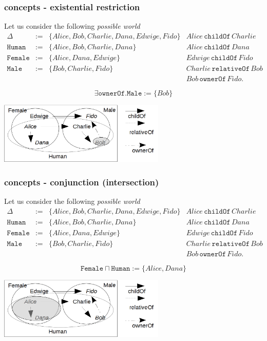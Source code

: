 \documentclass[8pt]{beamer}
\newcommand{\Human}{\mathtt{Human}}
\newcommand{\Male}{\mathtt{Male}}
\newcommand{\Female}{\mathtt{Female}}
\newcommand{\relative}{\mathtt{relativeOf}}
\newcommand{\child}{\mathtt{childOf}}
\newcommand{\owner}{\mathtt{ownerOf}}
\newcommand{\Alice}{Alice}
\newcommand{\Bob}{Bob}
\newcommand{\Charlie}{Charlie}
\newcommand{\Dana}{Dana}
\newcommand{\Edwige}{Edwige}
\newcommand{\Fido}{Fido}
\begin{document}
\begin{frame}
 \frametitle{\elplusplus concepts - existential restriction}
 Let us consider the following \emph{possible world}
 \[
 \begin{array}{rcl|l}
  \Delta & := & \{ \Alice, \Bob, \Charlie, \Dana, \Edwige, \Fido \} & \Alice\,\child\,\Charlie \\
  \Human & := & \{ \Alice, \Bob, \Charlie, \Dana \} & \Alice\,\child\,\Dana\\
  \Female & := & \{ \Alice, \Dana, \Edwige \} & \Edwige\,\child\,\Fido\\
  \Male & := & \{ \Bob, \Charlie, \Fido \} & \Charlie\,\relative\,\Bob \\
  & & & \Bob\,\owner\,\Fido .
 \end{array}
\]

\[
 \exists \owner.\Male := \{ \Bob \}
\]

 \begin{center}
  \includegraphics[width=300px, keepaspectratio]{images/exexists_big.png}  
 \end{center}
\end{frame}

\begin{frame}
 \frametitle{\elplusplus concepts - conjunction (intersection)}
 Let us consider the following \emph{possible world}
 \[
 \begin{array}{rcl|l}
  \Delta & := & \{ \Alice, \Bob, \Charlie, \Dana, \Edwige, \Fido \} & \Alice\,\child\,\Charlie \\
  \Human & := & \{ \Alice, \Bob, \Charlie, \Dana \} & \Alice\,\child\,\Dana\\
  \Female & := & \{ \Alice, \Dana, \Edwige \} & \Edwige\,\child\,\Fido\\
  \Male & := & \{ \Bob, \Charlie, \Fido \} & \Charlie\,\relative\,\Bob \\
  & & & \Bob\,\owner\,\Fido .
 \end{array}
\]

\[
 \Female \sqcap \Human := \{ \Alice, \Dana \}
\]

 \begin{center}
  \includegraphics[width=300px, keepaspectratio]{images/exint_big.png}  
 \end{center}
\end{frame}
\end{document}
